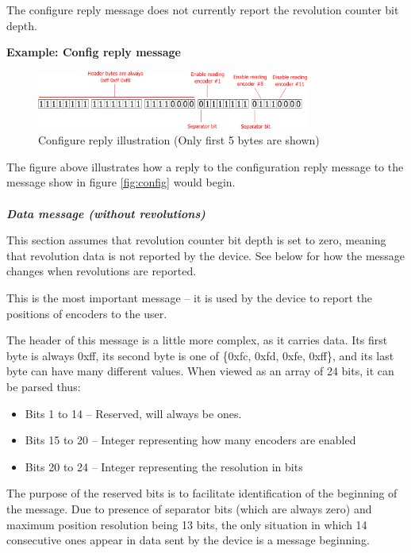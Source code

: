 \documentclass[twoside]{article}
\begin{document}
The configure reply message does not currently report the revolution counter bit depth.

\textbf{Example: Config reply message}
\begin{figure}[h!]
	\centering
	\includegraphics[width=0.8\textwidth]{figs/reply1}
	\caption{Configure reply illustration (Only first 5 bytes are shown)}
	\label{fig:JpgEpsCompare}
\end{figure}

The figure above illustrates how a reply to the configuration reply message to the message show in figure \ref{fig:config} would begin. \\\\

\noindent{}\emph{\textbf{Data message (without revolutions)}}

This section assumes that revolution counter bit depth is set to zero, meaning that revolution data is not reported by the device. See below for how the message changes when revolutions are reported.

This is the most important message -- it is used by the device to report the positions of encoders to the user.

The header of this message is a little more complex, as it carries data. Its first byte is always 0xff, its second byte is one of \{0xfc, 0xfd, 0xfe, 0xff\}, and its last byte can have many different values. When viewed as an array of 24 bits, it can be parsed thus:

\newpage{}
\begin{itemize}
\item Bits 1 to 14 -- Reserved, will always be ones.
\item Bits 15 to 20 -- Integer representing how many encoders are enabled
\item Bits 20 to 24 -- Integer representing the resolution in bits
\end{itemize}

The purpose of the reserved bits is to facilitate identification of the beginning of the message. Due to presence of separator bits (which are always zero) and maximum position resolution being 13 bits, the only situation in which 14 consecutive ones appear in data sent by the device is a message beginning.
\end{document}
